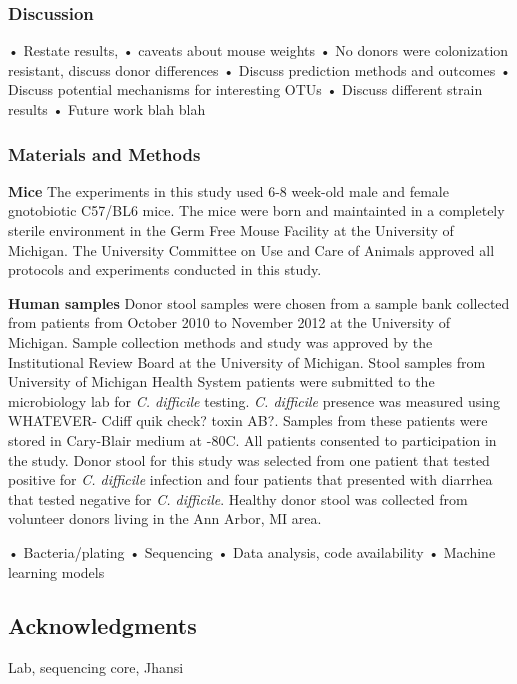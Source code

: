 \documentclass[11pt,]{article}
\begin{document}
\subsubsection{Discussion}\label{discussion}

• Restate results, • caveats about mouse weights • No donors were
colonization resistant, discuss donor differences • Discuss prediction
methods and outcomes • Discuss potential mechanisms for interesting OTUs
• Discuss different strain results • Future work blah blah

\subsubsection{Materials and Methods}\label{materials-and-methods}

\textbf{Mice} The experiments in this study used 6-8 week-old male and
female gnotobiotic C57/BL6 mice. The mice were born and maintainted in a
completely sterile environment in the Germ Free Mouse Facility at the
University of Michigan. The University Committee on Use and Care of
Animals approved all protocols and experiments conducted in this study.

\textbf{Human samples} Donor stool samples were chosen from a sample
bank collected from patients from October 2010 to November 2012 at the
University of Michigan. Sample collection methods and study was approved
by the Institutional Review Board at the University of Michigan. Stool
samples from University of Michigan Health System patients were
submitted to the microbiology lab for \emph{C. difficile} testing.
\emph{C. difficile} presence was measured using WHATEVER- Cdiff quik
check? toxin AB?. Samples from these patients were stored in Cary-Blair
medium at -80C. All patients consented to participation in the study.
Donor stool for this study was selected from one patient that tested
positive for \emph{C. difficile} infection and four patients that
presented with diarrhea that tested negative for \emph{C. difficile}.
Healthy donor stool was collected from volunteer donors living in the
Ann Arbor, MI area.

• Bacteria/plating • Sequencing • Data analysis, code availability •
Machine learning models

\subsection{Acknowledgments}\label{acknowledgments}

Lab, sequencing core, Jhansi
\end{document}
